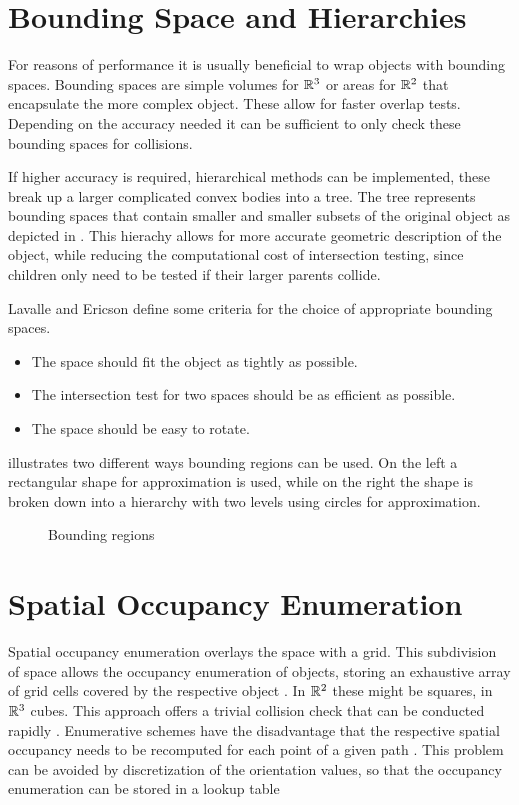\section{Bounding Space and Hierarchies}
For reasons of performance it is usually beneficial to wrap objects with bounding spaces. Bounding spaces are simple volumes for $\mathbb{R}^3$ or areas for $\mathbb{R}^2$ that encapsulate the more complex object. These allow for faster overlap tests. Depending on the accuracy needed it can be sufficient to only check these bounding spaces for collisions. \cite{LaValle.2006,Ericson.2005}

If higher accuracy is required, hierarchical methods can be implemented, these break up a larger complicated convex bodies into a tree. The tree represents bounding spaces that contain smaller and smaller subsets of the original object as depicted in . This hierachy allows for more accurate geometric description of the object, while reducing the computational cost of intersection testing, since children only need to be tested if their larger parents collide. \cite{LaValle.2006,Ericson.2005}

Lavalle and Ericson define some criteria for the choice of appropriate bounding spaces.

\begin{itemize}
	\item The space should fit the object as tightly as possible.
	\item The intersection test for two spaces should be as efficient as possible.
	\item The space should be easy to rotate.
\end{itemize}

 illustrates two different ways bounding regions can be used. On the left a rectangular shape for approximation is used, while on the right the shape is broken down into a hierarchy with two levels using circles for approximation.

\begin{figure}[h]
    \caption{Bounding regions}
    \label{fig:boundingRegions}
\end{figure}

\section{Spatial Occupancy Enumeration} \label{sec:spatialOccupancyEnumeration}
Spatial occupancy enumeration overlays the space with a grid. This subdivision of space allows the occupancy enumeration of objects, storing an exhaustive array of grid cells covered by the respective object \cite{Ericson.2005,Hayward.1986}. In $\mathbb{R}^2$ these might be squares, in $\mathbb{R}^3$ cubes. This approach offers a trivial collision check that can be conducted rapidly \cite{Ericson.2005,Hayward.1986}. Enumerative schemes have the disadvantage that the respective spatial occupancy needs to be recomputed for each point of a given path \cite{Hayward.1986}. This problem can be avoided by discretization of the orientation values, so that the occupancy enumeration can be stored in a lookup table \cite{Ziegler.2008} 

